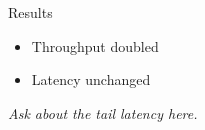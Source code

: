 
\begin{frame}{Results}
\begin{itemize}
\item Throughput doubled
\item Latency unchanged
\end{itemize}
\pause
{%
\small
\textit{Ask about the tail latency here.}
}
\end{frame}
